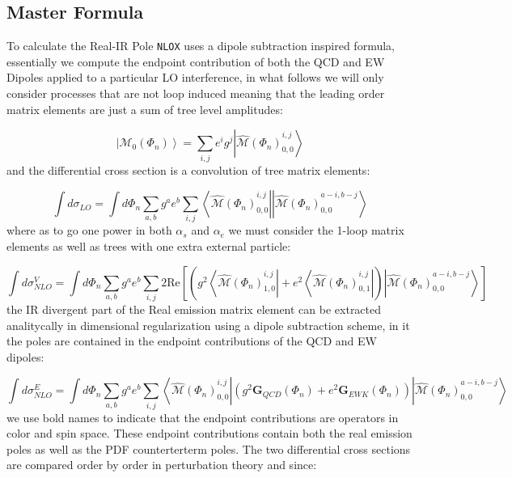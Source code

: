 \documentclass[a4paper]{article}
\def \NLOX{\texttt{NLOX} }
\begin{document}
\subsection{Master Formula}
To calculate the Real-IR Pole \NLOX uses a dipole subtraction inspired formula, essentially we 
compute the endpoint contribution of both the QCD and EW Dipoles applied to a particular LO 
interference, in what follows we will only consider processes that are not loop induced meaning 
that the leading order matrix elements are just a sum of tree level amplitudes:

\begin{equation}
 \left|\mathcal{M}_{0}(\Phi_n)\right> = \sum_{i,j}e^i g^j \left|{\hat{\mathcal{M}}(\Phi_n)}^{i,j}_{0,0}\right>
\end{equation}
and the differential cross section is a convolution of tree matrix elements:

\begin{equation}
 \int d\sigma_{LO} = \int d\Phi_{n}
 \sum_{a,b} g^{a} e^{b}\sum_{i,j}
 \left<{\hat{\mathcal{M}}(\Phi_n)}^{i,j}_{0,0}\right|
 \left|{\hat{\mathcal{M}}(\Phi_n)}^{a-i,b-j}_{0,0}\right>
\end{equation}
where as to go one power in both $\alpha_s$ and $\alpha_e$ we must consider the 1-loop
matrix elements as well as trees with one extra external particle:

\begin{equation}
 \int d\sigma^V_{NLO} = 
 \int d\Phi_{n}\sum_{a,b}
 g^a e^b 
 \sum_{i,j}
 2\text{Re}\left[
 \left(
  g^2\left<{\hat{\mathcal{M}}(\Phi_n)}^{i,j}_{1,0}\right|
 +e^2\left<{\hat{\mathcal{M}}(\Phi_n)}^{i,j}_{0,1}\right|
 \right)
 \left|{\hat{\mathcal{M}}(\Phi_n)}^{a-i,b-j}_{0,0}\right>
 \right]
\end{equation}
the IR divergent part of the Real emission matrix element can be extracted analitycally in 
dimensional regularization using a dipole subtraction scheme, in it the poles are contained 
in the endpoint contributions of the QCD and EW dipoles:

\begin{equation}
 \int d\sigma^E_{NLO} = \int d\Phi_{n}
 \sum_{a,b} g^{a} e^{b} 
 \sum_{i,j}
 \left<{\hat{\mathcal{M}}(\Phi_n)}^{i,j}_{0,0}\right|
 \left(
 g^2\textbf{G}_{QCD}(\Phi_n)
 +
 e^2\textbf{G}_{EWK}(\Phi_n)
 \right)
 \left|{\hat{\mathcal{M}}(\Phi_n)}^{a-i,b-j}_{0,0}\right>
\end{equation}
we use bold names to indicate that the endpoint contributions are operators in color and spin space. 
These endpoint contributions contain both the real emission poles as well as the PDF counterterterm poles.
The two differential cross sections are compared order by order in perturbation theory and since:
\end{document}
